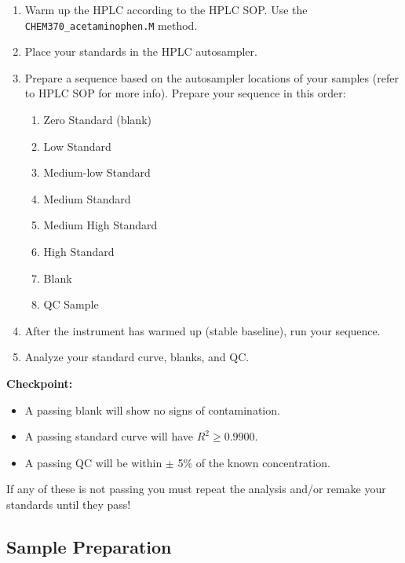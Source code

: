 \documentclass[]{tufte-book}
\providecommand{\tightlist}{%
  \setlength{\itemsep}{0pt}\setlength{\parskip}{0pt}}
\begin{document}
\begin{enumerate}
\def\labelenumi{\arabic{enumi}.}
\tightlist
\item
  Warm up the HPLC according to the HPLC SOP. Use the \texttt{CHEM370\_acetaminophen.M} method.
\item
  Place your standards in the HPLC autosampler.
\item
  Prepare a sequence based on the autosampler locations of your samples (refer to HPLC SOP for more info). Prepare your sequence in this order:

  \begin{enumerate}
  \def\labelenumii{\arabic{enumii}.}
  \tightlist
  \item
    Zero Standard (blank)
  \item
    Low Standard
  \item
    Medium-low Standard
  \item
    Medium Standard
  \item
    Medium High Standard
  \item
    High Standard
  \item
    Blank
  \item
    QC Sample
  \end{enumerate}
\item
  After the instrument has warmed up (stable baseline), run your sequence.
\item
  Analyze your standard curve, blanks, and QC.
\end{enumerate}

\begin{marginfigure}
  \textbf{Checkpoint:}
  
  \begin{itemize}
  \tightlist
  \item
    A passing blank will show no signs of contamination.\\
  \item
    A passing standard curve will have \(R^2 \ge 0.9900\).\\
  \item
    A passing QC will be within \(\pm\) 5\% of the known concentration.
  \end{itemize}
  
  If any of these is not passing you must repeat the analysis and/or
  remake your standards until they pass!
  \end{marginfigure}

\hypertarget{sample-preparation}{%
\subsection{Sample Preparation}\label{sample-preparation}}
\end{document}
